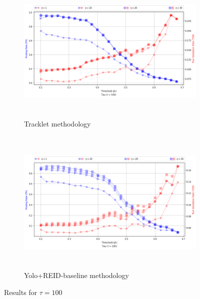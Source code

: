 \documentclass{article}
\begin{document}
\begin{figure}[H]
    \begin{subfigure}{0.9\textwidth}
        \includegraphics[width=12cm, height=7cm]{images_results/tracklet_tau100.png} 
        \caption{Tracklet methodology}
        \label{fig:subim1}
    \end{subfigure}
    
    \begin{subfigure}{0.9\textwidth}
        \includegraphics[width=12cm, height=7cm]{images_results/yolo_tau100.png}
        \caption{Yolo+REID-baseline methodology}
        \label{fig:subim2}
    \end{subfigure}

\caption{Results for $\tau = 100$}
\label{fig:tracklet_tau100}
\end{figure}
\end{document}
